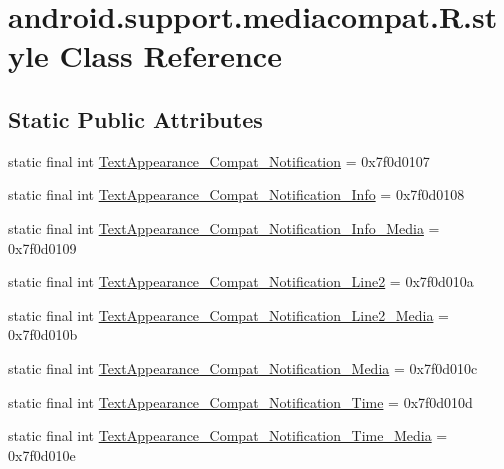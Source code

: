 \hypertarget{classandroid_1_1support_1_1mediacompat_1_1R_1_1style}{}\section{android.\+support.\+mediacompat.\+R.\+style Class Reference}
\label{classandroid_1_1support_1_1mediacompat_1_1R_1_1style}
\subsection*{Static Public Attributes}
\begin{DoxyCompactItemize}
\item 
static final int \mbox{\hyperlink{classandroid_1_1support_1_1mediacompat_1_1R_1_1style_a5be05765d7d9f2554774adfeb58216db}{Text\+Appearance\+\_\+\+Compat\+\_\+\+Notification}} = 0x7f0d0107
\item 
static final int \mbox{\hyperlink{classandroid_1_1support_1_1mediacompat_1_1R_1_1style_a64f71dddd320a8c3eed78e2455e727b8}{Text\+Appearance\+\_\+\+Compat\+\_\+\+Notification\+\_\+\+Info}} = 0x7f0d0108
\item 
static final int \mbox{\hyperlink{classandroid_1_1support_1_1mediacompat_1_1R_1_1style_a01fa01e023d645ce6ce441565683e22e}{Text\+Appearance\+\_\+\+Compat\+\_\+\+Notification\+\_\+\+Info\+\_\+\+Media}} = 0x7f0d0109
\item 
static final int \mbox{\hyperlink{classandroid_1_1support_1_1mediacompat_1_1R_1_1style_afc492ecce64a2462ef25d9433aa9b65f}{Text\+Appearance\+\_\+\+Compat\+\_\+\+Notification\+\_\+\+Line2}} = 0x7f0d010a
\item 
static final int \mbox{\hyperlink{classandroid_1_1support_1_1mediacompat_1_1R_1_1style_af2ebb03f4c31f395fa903ba7773c208f}{Text\+Appearance\+\_\+\+Compat\+\_\+\+Notification\+\_\+\+Line2\+\_\+\+Media}} = 0x7f0d010b
\item 
static final int \mbox{\hyperlink{classandroid_1_1support_1_1mediacompat_1_1R_1_1style_a41001c01d7dba9cd87333d9a10407232}{Text\+Appearance\+\_\+\+Compat\+\_\+\+Notification\+\_\+\+Media}} = 0x7f0d010c
\item 
static final int \mbox{\hyperlink{classandroid_1_1support_1_1mediacompat_1_1R_1_1style_a0fede7691a6e18add5bb4d4b98de1a6f}{Text\+Appearance\+\_\+\+Compat\+\_\+\+Notification\+\_\+\+Time}} = 0x7f0d010d
\item 
static final int \mbox{\hyperlink{classandroid_1_1support_1_1mediacompat_1_1R_1_1style_a1aad10786f6f7ff9172d24537dd7fe41}{Text\+Appearance\+\_\+\+Compat\+\_\+\+Notification\+\_\+\+Time\+\_\+\+Media}} = 0x7f0d010e

\end{DoxyCompactItemize}
